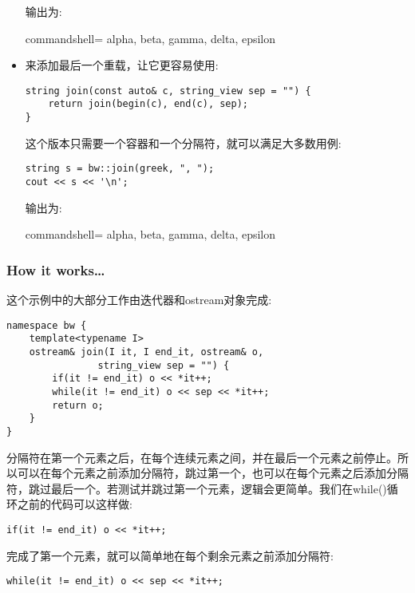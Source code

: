 \begin{itemize}
输出为:

\begin{tcblisting}{commandshell={}}
alpha, beta, gamma, delta, epsilon
\end{tcblisting}

\item 
来添加最后一个重载，让它更容易使用:

\begin{lstlisting}[style=styleCXX]
string join(const auto& c, string_view sep = "") {
	return join(begin(c), end(c), sep);
}
\end{lstlisting}

这个版本只需要一个容器和一个分隔符，就可以满足大多数用例:

\begin{lstlisting}[style=styleCXX]
string s = bw::join(greek, ", ");
cout << s << '\n';
\end{lstlisting}

输出为:

\begin{tcblisting}{commandshell={}}
alpha, beta, gamma, delta, epsilon
\end{tcblisting}
\end{itemize}

\subsubsection{How it works…}

这个示例中的大部分工作由迭代器和ostream对象完成:

\begin{lstlisting}[style=styleCXX]
namespace bw {
	template<typename I>
	ostream& join(I it, I end_it, ostream& o,
				string_view sep = "") {
		if(it != end_it) o << *it++;
		while(it != end_it) o << sep << *it++;
		return o;
	}
}
\end{lstlisting}

分隔符在第一个元素之后，在每个连续元素之间，并在最后一个元素之前停止。所以可以在每个元素之前添加分隔符，跳过第一个，也可以在每个元素之后添加分隔符，跳过最后一个。若测试并跳过第一个元素，逻辑会更简单。我们在while()循环之前的代码可以这样做:

\begin{lstlisting}[style=styleCXX]
if(it != end_it) o << *it++;
\end{lstlisting}

完成了第一个元素，就可以简单地在每个剩余元素之前添加分隔符:

\begin{lstlisting}[style=styleCXX]
while(it != end_it) o << sep << *it++;
\end{lstlisting}

